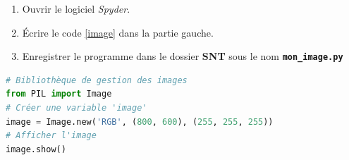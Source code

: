 \documentclass[svgnames,11pt]{beamer}
\begin{document}
\begin{frame}[fragile]
    \frametitle{}
\begin{activite}
\begin{enumerate}
    \item Ouvrir le logiciel \emph{Spyder}.
    \item Écrire le code \ref{image} dans la partie gauche.
    \item Enregistrer le programme dans le dossier \textbf{SNT} sous le nom \textbf{\texttt{mon\_image.py}}
\end{enumerate}
\end{activite}
\begin{center}
\begin{lstlisting}[language=Python , basicstyle=\ttfamily\small, xleftmargin=0.em, xrightmargin=0.em]
# Bibliothèque de gestion des images
from PIL import Image
# Créer une variable 'image'
image = Image.new('RGB', (800, 600), (255, 255, 255))
# Afficher l'image
image.show()
\end{lstlisting}
\label{image}
\end{center}

\end{frame}
\end{document}
